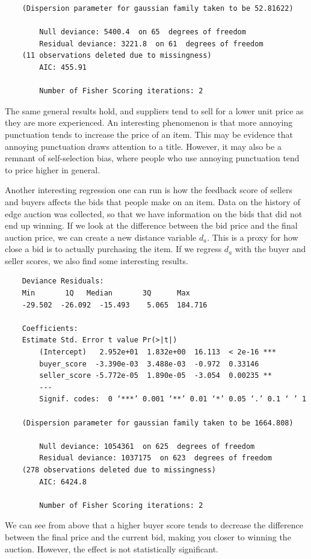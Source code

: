 \documentclass[psamsfonts]{amsart}
\newenvironment{sol}{\vspace{0.25cm}{\large \bfseries Solution:}}{\qedsymbol}
\begin{document}
\begin{sol}
\begin{verbatim}
    (Dispersion parameter for gaussian family taken to be 52.81622)
    
        Null deviance: 5400.4  on 65  degrees of freedom
        Residual deviance: 3221.8  on 61  degrees of freedom
    (11 observations deleted due to missingness)
        AIC: 455.91
    
        Number of Fisher Scoring iterations: 2
\end{verbatim}

The same general results hold, and suppliers tend to sell for a lower unit price as they are more experienced. An interesting phenomenon is that more annoying punctuation tends to increase the price of an item. This may be evidence that annoying punctuation draws attention to a title. However, it may also be a remnant of self-selection bias, where people who use annoying punctuation tend to price higher in general.

Another interesting regression one can run is how the feedback score of sellers and buyers affects the bids that people make on an item. Data on the history of edge auction was collected, so that we have information on the bids that did not end up winning. If we look at the difference between the bid price and the final auction price, we can create a new distance variable $d_a$. This is a proxy for how close a bid is to actually purchasing the item. If we regress $d_a$ with the buyer and seller scores, we also find some interesting results. 

\begin{verbatim}
    Deviance Residuals: 
    Min       1Q   Median       3Q      Max  
    -29.502  -26.092  -15.493    5.065  184.716  

    Coefficients:
    Estimate Std. Error t value Pr(>|t|)    
        (Intercept)   2.952e+01  1.832e+00  16.113  < 2e-16 ***
        buyer_score  -3.390e-03  3.488e-03  -0.972  0.33146    
        seller_score -5.772e-05  1.890e-05  -3.054  0.00235 ** 
        ---
        Signif. codes:  0 ‘***’ 0.001 ‘**’ 0.01 ‘*’ 0.05 ‘.’ 0.1 ‘ ’ 1 

    (Dispersion parameter for gaussian family taken to be 1664.808)

        Null deviance: 1054361  on 625  degrees of freedom
        Residual deviance: 1037175  on 623  degrees of freedom
    (278 observations deleted due to missingness)
        AIC: 6424.8

        Number of Fisher Scoring iterations: 2
\end{verbatim}

We can see from above that a higher buyer score tends to decrease the difference between the final price and the current bid, making you closer to winning the auction. However, the effect is not statistically significant. 
\end{sol}
\end{document}
